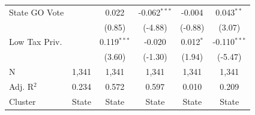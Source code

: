 \begin{tabular*}{\textwidth}{@{\extracolsep{\fill}}lccccc}
   State GO Vote        &               & 0.022          & -0.062$^{***}$ & -0.004      & 0.043$^{**}$\\   
                        &               & (0.85)        & (-4.88)       & (-0.88)    & (3.07)\\   
   Low Tax Priv.        &               & 0.119$^{***}$  & -0.020         & 0.012$^{*}$ & -0.110$^{***}$\\   
                        &               & (3.60)        & (-1.30)       & (1.94)     & (-5.47)\\   
   \hline
   N         & 1,341         & 1,341          & 1,341          & 1,341       & 1,341\\  
   Adj. R$^2$       & 0.234         & 0.572          & 0.597          & 0.010       & 0.209\\  
   Cluster              & State & State & State & State & State\\  
   \bottomrule
\end{tabular*}
\par\endgroup
